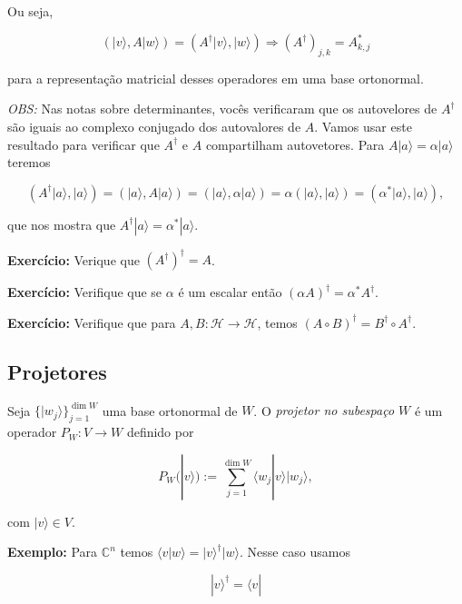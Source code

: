 \documentclass[11pt]{article}
\begin{document}
Ou seja,

\begin{equation}
(|v\rangle,A|w\rangle) = (A^{\dagger}|v\rangle,|w\rangle)\Rightarrow (A^{\dagger})_{j,k} = A_{k,j}^{*}
\end{equation}

para a representação matricial desses operadores em uma base ortonormal.

    \emph{OBS:} Nas notas sobre determinantes, vocês verificaram que os
autovelores de \(A^{\dagger}\) são iguais ao complexo conjugado dos
autovalores de \(A\). Vamos usar este resultado para verificar que
\(A^{\dagger}\) e \(A\) compartilham autovetores. Para
\(A|a\rangle=\alpha|a\rangle\) teremos

\begin{equation}
(A^{\dagger}|a\rangle,|a\rangle) = (|a\rangle,A|a\rangle) = (|a\rangle,\alpha|a\rangle) = \alpha(|a\rangle,|a\rangle) = (\alpha^{*}|a\rangle,|a\rangle),
\end{equation}

que nos mostra que \(A^{\dagger}|a\rangle=\alpha^{*}|a\rangle\).

\textbf{Exercício:} Verique que \((A^{\dagger})^{\dagger}=A\).

\textbf{Exercício:} Verifique que se \(\alpha\) é um escalar então
\((\alpha A)^{\dagger}=\alpha^{*}A^{\dagger}\).

\textbf{Exercício:} Verifique que para
\(A,B:\mathcal{H}\rightarrow\mathcal{H}\), temos
\((A\circ B)^{\dagger} = B^{\dagger}\circ A^{\dagger}\).

    \subsection{Projetores}\label{projetores}

Seja \(\{|w_{j}\rangle\}_{j=1}^{\dim W}\) uma base ortonormal de \(W\).
O \emph{projetor no subespaço \(W\)} é um operador
\(P_{W}:V\rightarrow W\) definido por

\begin{equation}
P_{W}(|v\rangle) := \sum_{j=1}^{\dim W}\langle w_{j}|v\rangle|w_{j}\rangle,
\end{equation}

com \(|v\rangle\in V\).

\textbf{Exemplo:} Para \(\mathbb{C}^{n}\) temos
\(\langle v|w\rangle = |v\rangle^{\dagger}|w\rangle\). Nesse caso usamos

\begin{equation}
|v\rangle^{\dagger} = \langle v|
\end{equation}
\end{document}
